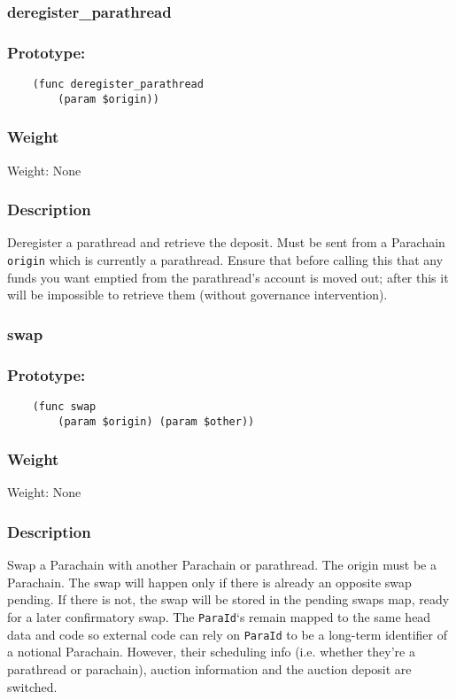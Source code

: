 \documentclass[11pt,a4paper]{article}
\begin{document}
\subsubsection{deregister\_parathread}
\subsubsection*{Prototype:}
\begin{verbatim}
    (func deregister_parathread
        (param $origin))
\end{verbatim}
\subsubsection*{Weight}
Weight: None
\subsubsection*{Description}
Deregister a parathread and retrieve the deposit. Must be sent from a Parachain \verb|origin| which is currently a parathread. Ensure that before calling this that any funds you want emptied from the parathread's account is moved out; after this it will be impossible to retrieve them (without governance intervention).

\subsubsection{swap}
\subsubsection*{Prototype:}
\begin{verbatim}
    (func swap
        (param $origin) (param $other))
\end{verbatim}
\subsubsection*{Weight}
Weight: None
\subsubsection*{Description}
Swap a Parachain with another Parachain or parathread. The origin must be a Parachain. The swap will happen only if there is already an opposite swap pending. If there is not, the swap will be stored in the pending swaps map, ready for a later confirmatory swap.
The \verb|ParaId|`s remain mapped to the same head data and code so external code can rely on \verb|ParaId| to be a long-term identifier of a notional Parachain. However, their scheduling info (i.e. whether they're a parathread or parachain), auction information and the auction deposit are switched.
\end{document}
